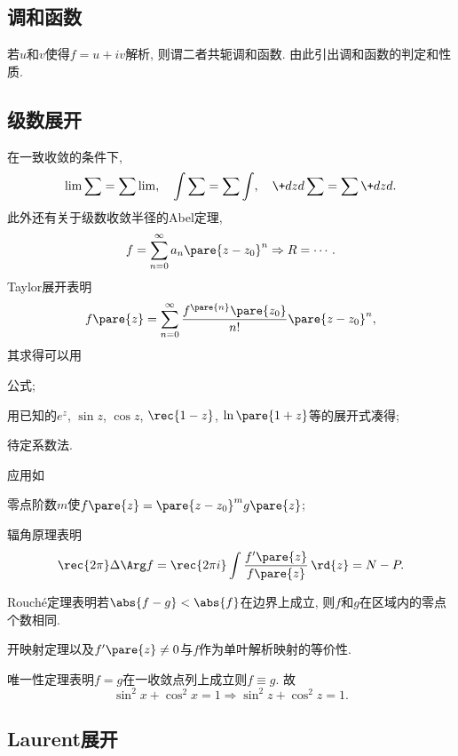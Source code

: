 \documentclass[../ComplexVariable.tex]{subfiles}
\begin{document}

\subsection{调和函数} %
\label{sub:调和函数}

若$u$和$v$使得$f=u+iv$解析, 则谓二者共轭调和函数. 由此引出调和函数的判定和性质.


\subsection{级数展开} %
\label{sub:级数展开}

在一致收敛的条件下,
\[ \lim \sum = \sum \lim,\quad \int \sum = \sum \int,\quad \+dzd{} \sum = \sum \+dzd{}. \]
此外还有关于级数收敛半径的Abel定理,
\[ f=\sum_{n=0}^\infty a_n\pare{z-z_0}^n \Rightarrow R = \cdots. \]
Taylor展开表明
\[ f\pare{z} = \sum_{n=0}^\infty \frac{f^{\pare{n}}\pare{z_0}}{n!}\pare{z-z_0}^n, \]
其求得可以用
\begin{cenum}
    \item 公式;
    \item 用已知的$e^z$, $\sin z$, $\cos z$, $\displaystyle \rec{1-z}$, $\displaystyle \ln \pare{1+z}$等的展开式凑得;
    \item 待定系数法.
\end{cenum}
应用如
\begin{cenum}
    \item 零点阶数$m$使$f\pare{z} = \pare{z-z_0}^mg\pare{z}$;
    \item 辐角原理表明
    \[ \rec{2\pi}\Delta\Arg f = \rec{2\pi i} \int \frac{f'\pare{z}}{f\pare{z}}\,\rd{z} = N - P. \]
    \item Rouch\'e定理表明若$\abs{f-g} < \abs{f}$在边界上成立, 则$f$和$g$在区域内的零点个数相同.
    \item 开映射定理以及$f'\pare{z}\neq 0$与$f$作为单叶解析映射的等价性.
    \item 唯一性定理表明$f=g$在一收敛点列上成立则$f\equiv g$. 故
    \[ \sin^2 x + \cos^2 x = 1 \Rightarrow \sin^2 z + \cos^2 z = 1. \]
\end{cenum}


\subsection{Laurent展开} %
\label{sub:laurent展开}
\end{document}
